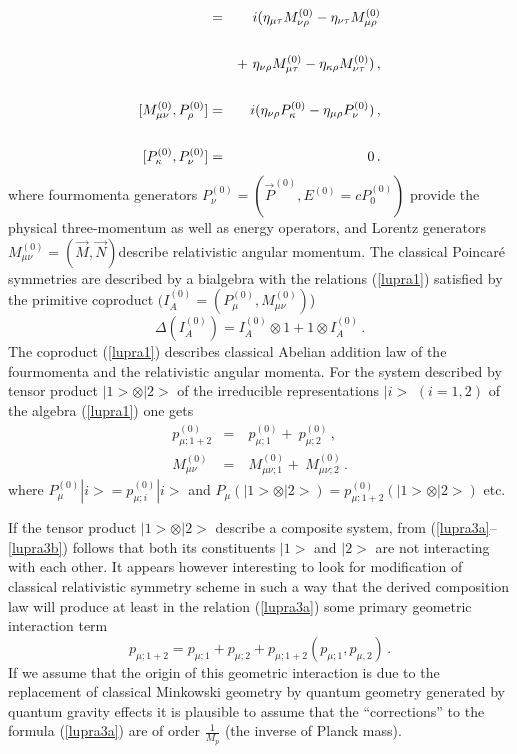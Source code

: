 \documentclass[a4paper,a4paper]{article}
\begin{document}
\begin{eqnarray}
[M^{(0)}_{\mu\nu}, M^{(0)}_{\rho\tau}] & = &  i(\eta_{\mu
\tau}M^{(0)}_{\nu\rho} - \eta_{\nu\tau}M^{(0)}_{\mu\rho} \cr\cr &&
+ \ \eta_{\nu\rho}M^{(0)}_{\mu\tau} -
\eta_{\kappa\rho}M^{(0)}_{\nu\tau})\, , \cr\cr [M^{(0)}_{\mu\nu},
P^{(0)}_{\rho}] & = & i ( \eta_{\nu\rho}P^{(0)}_{\kappa} -
\eta_{\mu\rho}P^{(0)}_{\nu})\, , \cr\cr [P^{(0)}_{\kappa},
P^{(0)}_{\nu}]& = & 0 \, .
\label{lupra1}
\end{eqnarray}
where fourmomenta generators $P^{(0)}_{\nu}=
(\overrightarrow{P}^{(0)},E^{(0)} = c P^{(0)}_0 ) $ provide the
physical three-momentum as well as energy operators, and Lorentz
generators $M^{(0)}_{\mu\nu}= ( \overrightarrow{M},
\overrightarrow{N}) $describe relativistic angular momentum. The
classical Poincar\'{e} symmetries are described by a bialgebra
with the relations (\ref{lupra1})
 satisfied by the primitive coproduct $(I^{(0)}_A = (P^{(0)}_\mu,
 M^{(0)}_{\mu\nu})$)
\begin{equation}\label{lupra2}
  \Delta(I^{(0)}_A )= I^{(0)}_A \otimes 1 + 1 \otimes I^{(0)}_A\,
  .
\end{equation}
The coproduct (\ref{lupra1}) describes classical Abelian addition
law of the  fourmomenta  and the  relativistic angular momenta.
For the system described by tensor product $ |1> \otimes |2>$ of
 the irreducible representations $|i> $ $(i=1,2)$ of the algebra
(\ref{lupra1}) one gets
\begin{eqnarray}\label{lupra3a}
  p^{(0)}_{\mu;1+2} & = & \ p^{(0)}_{\mu;1} + \ p^{(0)}_{\mu;2}\,
  ,\\ \label{lupra3b}
M^{(0)}_{\mu\nu}  & =  &\  M^{(0)}_{\mu\nu;1}  + \
M^{(0)}_{\mu\nu;2}\, . \label{lupra3}
\end{eqnarray}
where $P^{(0)}_\mu |i> = p^{(0)}_{\mu;i} |i>$ and $ P_\mu
(|1>\otimes |2>) = p^{(0)}_{\mu;1+2}(|1>\otimes |2>)$ etc.

If the tensor product $|1>\otimes |2>$ describe a composite
system,  from (\ref{lupra3a}--\ref{lupra3b}) follows that both its
constituents $|1>$ and $|2>$ are not interacting with each other.
It appears however interesting to look for modification of
classical relativistic symmetry scheme in such a way that the
derived composition law will produce at least in the relation
(\ref{lupra3a}) some primary geometric interaction term
\begin{equation}\label{lupra4}
  p_{\mu;1+2} = p_{\mu;1} + p_{\mu;2} +
  p_{\mu;1+2}(p_{\mu;1},p_{\mu,2})\, .
\end{equation}
If we assume that the origin of this geometric interaction is due
to the replacement of classical Minkowski geometry by quantum
geometry generated by quantum gravity effects it is plausible to
assume that the ``corrections''  to the formula (\ref{lupra3a})
are of order  $\frac{1}{M_{p}}$ (the inverse of Planck mass).
\end{document}
